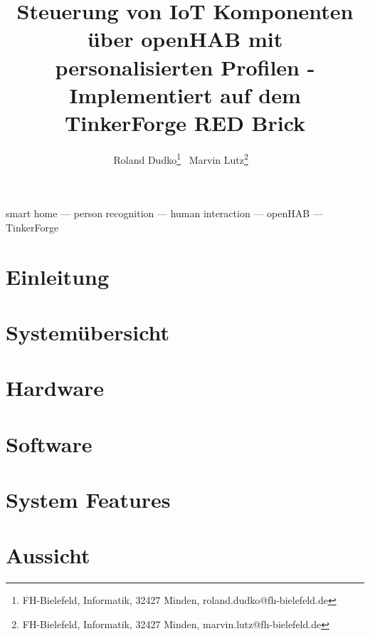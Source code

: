 \documentclass{lni}
\author{Roland Dudko\footnote{FH-Bielefeld, Informatik, 32427 Minden, roland.dudko@fh-bielefeld.de} \,
        Marvin Lutz\footnote{FH-Bielefeld, Informatik, 32427 Minden, marvin.lutz@fh-bielefeld.de} \ }
\title{Steuerung von IoT Komponenten über openHAB mit personalisierten Profilen - Implementiert auf dem TinkerForge RED Brick}
\renewcommand{\headrulewidth}{0.4pt} %
\begin{document}
\maketitle
\renewcommand{\refname}{Literaturverzeichnis}
\setcounter{footnote}{2} %

\begin{abstract}

\end{abstract}
\begin{keywords}
smart home --- person recognition --- human interaction --- openHAB --- TinkerForge
\end{keywords}

\section{Einleitung}


\pagestyle{fancy}
\fancyhead{} %
\fancyfoot{} %
\renewcommand{\headrulewidth}{0.4pt} %


\section{Systemübersicht}


\section{Hardware}


\section{Software}


\section{System Features}


\section{Aussicht}




\end{document}
